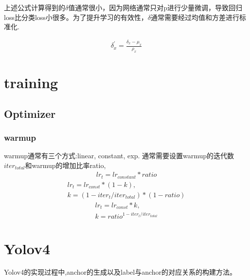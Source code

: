 \documentclass{article}
\begin{document}
上述公式计算得到的$\delta$值通常很小，因为网络通常只对p进行少量微调，导致回归loss比分类loss小很多。为了提升学习的有效性，$\delta$通常需要经过均值和方差进行标准化.

\begin{equation}
\begin{aligned}
\delta_{x}^{'}=\frac{\delta_x-\mu_x}{\rho_x}
\end{aligned}
\end{equation}

\section{training}
\subsection{Optimizer}
\subsubsection{warmup}
warmup通常有三个方式:linear, constant, exp. 通常需要设置warmup的迭代数$iter_{total}$和warmup的增加比率ratio,
\begin{align}
lr_t = lr_{constant}*ratio
\end{align}
\begin{equation}
\begin{aligned}
lr_t = lr_{const}*(1-k), \\
k= (1-iter_t /iter_{total}) * (1-ratio)
\end{aligned}
\end{equation}
\begin{align}
lr_t = lr_{const}*k, \\
k=ratio^{1-iter_t/iter_{total}}
\end{align}

\section{Yolov4}
Yolov4的实现过程中,anchor的生成以及label与anchor的对应关系的构建方法。
\end{document}
